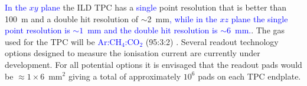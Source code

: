 \textcolor{blue}{In the $xy$ plane} the ILD TPC has a \textcolor{blue}{single} point resolution that is better than 100~{\mu}m and a double hit resolution of $\sim$2~mm\textcolor{blue}{, while in the $xz$ plane the single point resolution is $\sim 1$~mm and the double hit resolution is $\sim 6$~mm.}. The gas used for the TPC will be \textcolor{blue}{Ar:$\text{CH}_4$:$\text{CO}_{2}$} (95:3:2) \cite{arXiv:1006.3396}.  Several readout technology options designed to measure the ionisation current are currently under development.  For all potential options it is envisaged that the readout pads would be $\approx 1 \times 6$~$\text{mm}^{2}$ giving a total of approximately $10^{6}$ pads on each TPC endplate.

\begin{figure}[h!]
\centering
{}

\end{figure}
